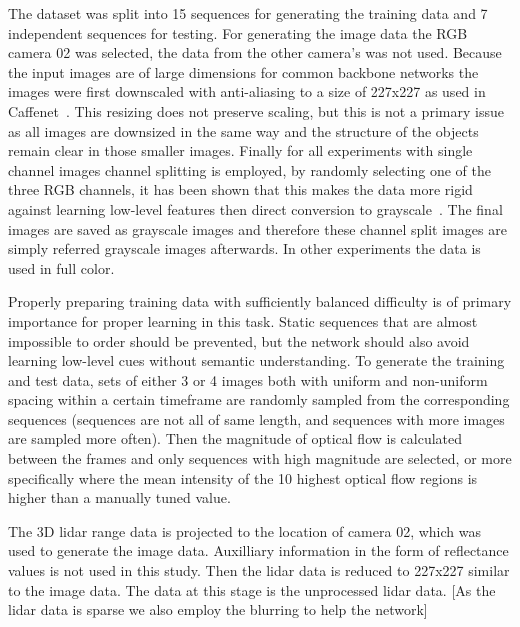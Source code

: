 The dataset was split into 15 sequences for generating the training data and 7 independent sequences for testing. For generating the image data the RGB camera 02 was selected, the data from the other camera's was not used. Because the input images are of large dimensions for common backbone networks the images were first downscaled with anti-aliasing to a size of 227x227 as used in Caffenet~\cite{jia2014}. This resizing does not preserve scaling, but this is not a primary issue as all images are downsized in the same way and the structure of the objects remain clear in those smaller images. Finally for all experiments with single channel images channel splitting is employed, by randomly selecting one of the three RGB channels, it has been shown that this makes the data more rigid against learning low-level features then direct conversion to grayscale~\cite{lee2017}. The final images are saved as grayscale images and therefore these channel split images are simply referred grayscale images afterwards. In other experiments the data is used in full color.

Properly preparing training data with sufficiently balanced difficulty is of primary importance for proper learning in this task. Static sequences that are almost impossible to order should be prevented, but the network should also avoid learning low-level cues without semantic understanding. To generate the training and test data, sets of either 3 or 4 images both with uniform and non-uniform spacing within a certain timeframe are randomly sampled from the corresponding sequences (sequences are not all of same length, and sequences with more images are sampled more often). Then the magnitude of optical flow is calculated between the frames and only sequences with high magnitude are selected\cite{misra2016}, or more specifically where the mean intensity of the 10 highest optical flow regions is higher than a manually tuned value. 


The 3D lidar range data is projected to the location of camera 02, which was used to generate the image data. Auxilliary information in the form of reflectance values is not used in this study. Then the lidar data is reduced to 227x227 similar to the image data. The data at this stage is the unprocessed lidar data. [As the lidar data is sparse we also employ the blurring to help the network]

